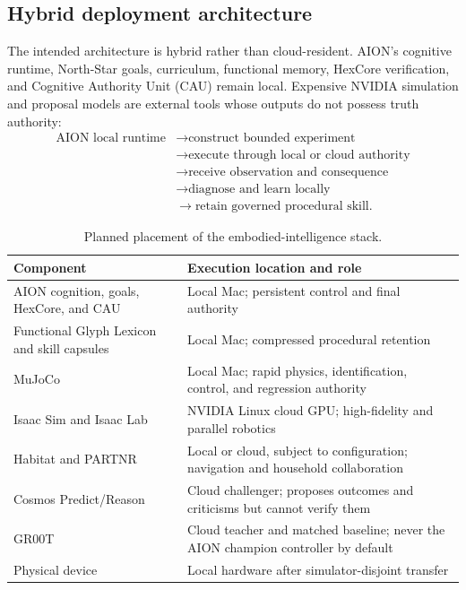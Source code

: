 \subsection{Hybrid deployment architecture}

The intended architecture is hybrid rather than cloud-resident.  AION's
cognitive runtime, North-Star goals, curriculum, functional memory, HexCore
verification, and Cognitive Authority Unit (CAU) remain local.  Expensive
NVIDIA simulation and proposal models are external tools whose outputs do not
possess truth authority:
\begin{equation}
\label{eq:hybrid-embodied-architecture}
\begin{aligned}
\text{AION local runtime}
&\rightarrow \text{construct bounded experiment}\nonumber\\
&\rightarrow \text{execute through local or cloud authority}\nonumber\\
&\rightarrow \text{receive observation and consequence}\nonumber\\
&\rightarrow \text{diagnose and learn locally}\nonumber\\
&\rightarrow \text{retain governed procedural skill}.
\end{aligned}
\end{equation}

\begin{table}[htbp]
\centering
\caption{Planned placement of the embodied-intelligence stack.}
\label{tab:embodied-platform-placement}
\begin{tabularx}{\linewidth}{@{}>{\raggedright\arraybackslash}X
                                  >{\raggedright\arraybackslash}X@{}}
\toprule
\textbf{Component} & \textbf{Execution location and role} \\
\midrule
AION cognition, goals, HexCore, and CAU & Local Mac; persistent control and final authority \\
Functional Glyph Lexicon and skill capsules & Local Mac; compressed procedural retention \\
MuJoCo & Local Mac; rapid physics, identification, control, and regression authority \\
Isaac Sim and Isaac Lab & NVIDIA Linux cloud GPU; high-fidelity and parallel robotics \\
Habitat and PARTNR & Local or cloud, subject to configuration; navigation and household collaboration \\
Cosmos Predict/Reason & Cloud challenger; proposes outcomes and criticisms but cannot verify them \\
GR00T & Cloud teacher and matched baseline; never the AION champion controller by default \\
Physical device & Local hardware after simulator-disjoint transfer \\
\bottomrule
\end{tabularx}
\end{table}

